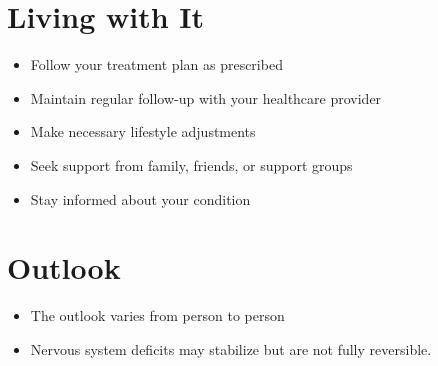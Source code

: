 \section{Living with It}
\begin{itemize}[noitemsep]
  \item Follow your treatment plan as prescribed
  \item Maintain regular follow-up with your healthcare provider
  \item Make necessary lifestyle adjustments
  \item Seek support from family, friends, or support groups
  \item Stay informed about your condition
\end{itemize}
\section{Outlook}
\begin{itemize}[noitemsep]
  \item The outlook varies from person to person
  \item Nervous system deficits may stabilize but are not fully reversible.
\end{itemize}
